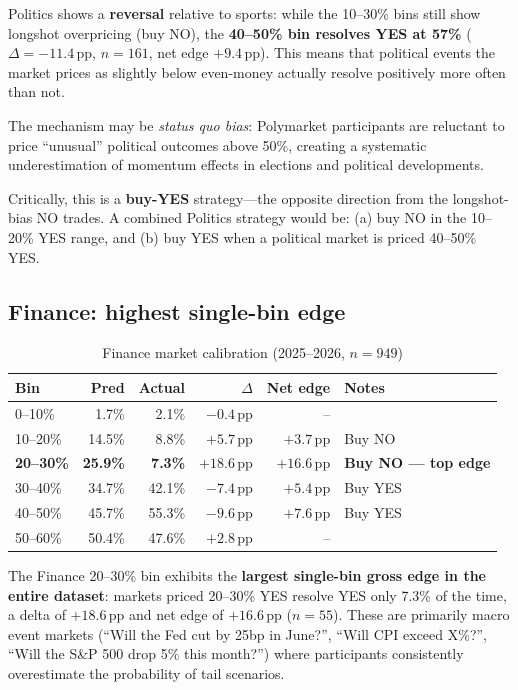 \documentclass[11pt,a4paper]{article}
\begin{document}
Politics shows a \textbf{reversal} relative to sports: while the 10--30\% bins
still show longshot overpricing (buy NO), the \textbf{40--50\% bin resolves YES
at 57\%} ($\Delta = -11.4\,\mathrm{pp}$, $n=161$, net edge $+9.4\,\mathrm{pp}$).
This means that political events the market prices as slightly below even-money
actually resolve positively more often than not.

The mechanism may be \emph{status quo bias}: Polymarket participants are
reluctant to price ``unusual'' political outcomes above 50\%, creating a
systematic underestimation of momentum effects in elections and political
developments.

Critically, this is a \textbf{buy-YES} strategy---the opposite direction from
the longshot-bias NO trades.
A combined Politics strategy would be: (a) buy NO in the 10--20\% YES range,
and (b) buy YES when a political market is priced 40--50\% YES.

\subsection{Finance: highest single-bin edge}

\begin{table}[H]
\centering
\caption{Finance market calibration (2025--2026, $n=949$)}
\label{tab:finance}
\small
\begin{tabular}{lrrrrl}
\toprule
Bin & Pred & Actual & $\Delta$ & Net edge & Notes \\
\midrule
0--10\%  & 1.7\% &  2.1\% & $-0.4\,\mathrm{pp}$ & -- & \\
10--20\% & 14.5\% &  8.8\% & $+5.7\,\mathrm{pp}$ & $+3.7\,\mathrm{pp}$ & Buy NO \\
\textbf{20--30\%} & \textbf{25.9\%} & \textbf{7.3\%} & $\mathbf{+18.6\,\mathrm{pp}}$ & $\mathbf{+16.6\,\mathrm{pp}}$ & \textbf{Buy NO --- top edge} \\
30--40\% & 34.7\% & 42.1\% & $-7.4\,\mathrm{pp}$ & $+5.4\,\mathrm{pp}$ & Buy YES \\
40--50\% & 45.7\% & 55.3\% & $-9.6\,\mathrm{pp}$ & $+7.6\,\mathrm{pp}$ & Buy YES \\
50--60\% & 50.4\% & 47.6\% & $+2.8\,\mathrm{pp}$ & -- & \\
\bottomrule
\end{tabular}
\end{table}

The Finance 20--30\% bin exhibits the \textbf{largest single-bin gross edge in
the entire dataset}: markets priced 20--30\% YES resolve YES only 7.3\% of the
time, a delta of $+18.6\,\mathrm{pp}$ and net edge of $+16.6\,\mathrm{pp}$
($n=55$).
These are primarily macro event markets (``Will the Fed cut by 25bp in June?'',
``Will CPI exceed X\%?'', ``Will the S\&P 500 drop 5\% this month?'') where
participants consistently overestimate the probability of tail scenarios.
\end{document}
